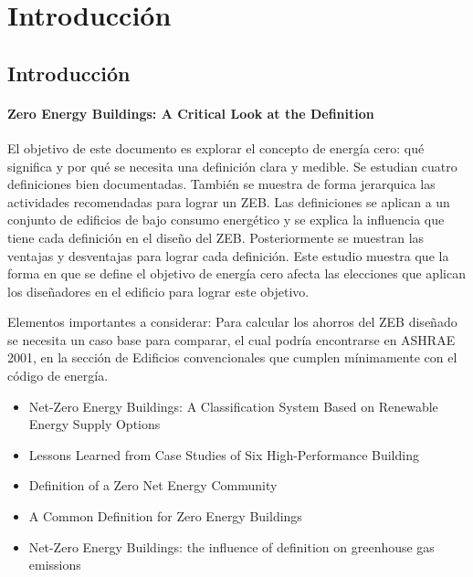 \chapter{Introducción}
\label{chap:introduccion}

 
 
\section{Introducción}






\subsubsection{Zero Energy Buildings: A Critical Look at the Definition}


El objetivo de este documento es explorar el concepto de energía cero: qué significa y por qué se necesita una definición clara y medible. Se estudian cuatro definiciones bien documentadas. También se muestra de forma jerarquica las actividades recomendadas para lograr un ZEB. Las definiciones se aplican a un conjunto de edificios de bajo consumo energético y se explica la influencia que tiene cada definición en el diseño del ZEB. Posteriormente se muestran las ventajas y desventajas para lograr cada definición. Este estudio muestra que la forma en que se define el objetivo de energía cero afecta las elecciones que aplican los diseñadores en el edificio para lograr este objetivo.


Elementos importantes a considerar: Para calcular los ahorros del ZEB diseñado se necesita un caso base para comparar, el cual podría encontrarse en ASHRAE 2001, en la sección de Edificios convencionales que cumplen mínimamente con el código de energía.

\begin{itemize}

\item Net-Zero Energy Buildings: A Classification System Based on Renewable Energy Supply Options
\item Lessons Learned from Case Studies of Six High-Performance Building
\item Definition of a Zero Net Energy Community
\item A Common Definition for Zero Energy Buildings
\item Net-Zero Energy Buildings: the influence of definition on greenhouse gas emissions

\end{itemize}


